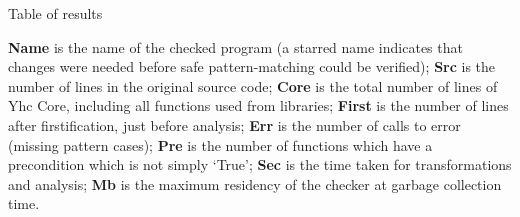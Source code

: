 \documentclass[preprint]{sigplanconf}
\newcommand{\C}[1]{\textsf{#1}}
\begin{document}
\begin{table}
\caption{Table of results}
\label{tab:results}

\smallskip

\textbf{Name} is the name of the checked program (a starred name indicates that changes were needed before safe pattern-matching could be verified);
\textbf{Src} is the number of lines in the original source code;
\textbf{Core} is the total number of lines of Yhc Core, including all functions used from libraries;
\textbf{First} is the number of lines after firstification, just before analysis;
\textbf{Err} is the number of calls to \C{error} (missing pattern cases);
\textbf{Pre} is the number of functions which have a precondition which is not simply `True';
\textbf{Sec} is the time taken for transformations and analysis;
\textbf{Mb} is the maximum residency of the checker at garbage collection time.

\smallskip\smallskip


\end{table}
\end{document}
